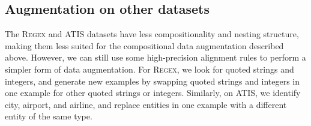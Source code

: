 \documentclass[11pt,letterpaper]{article}
\newcommand{\atis}{\textsc{ATIS}\xspace}
\newcommand{\regex}{\textsc{Regex}\xspace}
\newcommand{\catroot}{\textsc{Root}\xspace}
\newcommand{\catquotstr}{\textsc{Str}\xspace}
\newcommand{\catint}{\textsc{Int}\xspace}
\newcommand\pl[1]{}
\newcommand\rj[1]{}
\begin{document}
\subsection{Augmentation on other datasets}
%
%
%
%
%
%
%
%
%
%
%
The \regex and \atis datasets have 
less compositionality and nesting structure,
making them less suited for the compositional data augmentation
described above.
However, we can still use some high-precision alignment rules
to perform a simpler form of data augmentation.
For \regex, we look for quoted strings and integers,
and generate new examples by
swapping quoted strings and integers in one example
for other quoted strings or integers.
Similarly, on \atis, we identify city, airport, and airline,
and replace entities in one example with a different entity
of the same type.
\end{document}
